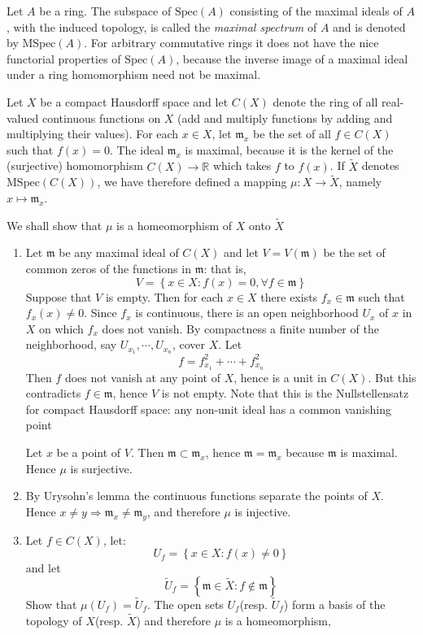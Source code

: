 \documentclass{solution}
\begin{document}
\begin{problem}
    Let $A$ be a ring. The subspace of $\mathrm{Spec}(A)$ consisting of the maximal ideals of $A$, with the induced topology, is called the \textit{maximal spectrum} of $A$ and is denoted by $\mathrm{MSpec}(A)$. For arbitrary commutative rings it does not have the nice functorial properties of $\mathrm{Spec}(A)$, because the inverse image of a maximal ideal under a ring homomorphism need not be maximal.

    Let $X$ be a compact Hausdorff space and let $C(X)$ denote the ring of all real-valued continuous functions on $X$ (add and multiply functions by adding and multiplying their values). For each $x \in X$, let $\mathfrak{m}_x$ be the set of all $f \in C(X)$ such that $f(x) = 0$. The ideal $\mathfrak{m}_x$ is maximal, because it is the kernel of the (surjective) homomorphism $C(X) \rightarrow \mathbb{R}$ which takes $f$ to $f(x)$. If $\tilde{X}$ denotes $\mathrm{MSpec}(C(X))$, we have therefore defined a mapping $\mu: X \rightarrow \tilde{X}$, namely $x \mapsto \mathfrak{m}_x$.

    We shall show that $\mu$ is a homeomorphism of $X$ onto $\tilde{X}$
    \begin{enumerate}
        \item Let $\mathfrak{m}$ be any maximal ideal of $C(X)$ and let $V = V(\mathfrak{m})$ be the set of common zeros of the functions in $\mathfrak{m}$: that is,
        $$V = \left\lbrace x \in X: f(x) = 0, \forall f \in \mathfrak{m} \right\rbrace$$
        Suppose that $V$ is empty. Then for each $x \in X$ there exists $f_x \in \mathfrak{m}$ such that $f_x(x) \ne 0$. Since $f_x$ is continuous, there is an open neighborhood $U_x$ of $x$ in $X$ on which $f_x$ does not vanish. By compactness a finite number of the neighborhood, say $U_{x_1}, \cdots, U_{x_n}$, cover $X$. Let
        $$f = f_{x_1}^2 + \cdots + f_{x_n}^2$$
        Then $f$ does not vanish at any point of $X$, hence is a unit in $C(X)$. But this contradicts $f \in \mathfrak{m}$, hence $V$ is not empty. {\color{red} Note that this is the Nullstellensatz for compact Hausdorff space: any non-unit ideal has a common vanishing point}
        
        Let $x$ be a point of $V$. Then $\mathfrak{m} \subset \mathfrak{m}_x$, hence $\mathfrak{m} = \mathfrak{m}_x$ because $\mathfrak{m}$ is maximal. Hence $\mu$ is surjective. 

        \item By Urysohn's lemma the continuous functions separate the points of $X$. Hence $x \ne y \Rightarrow \mathfrak{m}_x \ne \mathfrak{m}_y$, and therefore $\mu$ is injective.
        \item Let $f \in C(X)$, let:
        $$U_f = \left\lbrace x \in X: f(x) \ne 0 \right\rbrace$$
        and let
        $$\tilde{U}_f = \left\lbrace \mathfrak{m} \in \tilde{X}: f \notin \mathfrak{m} \right\rbrace$$
        Show that $\mu(U_f) = \tilde{U}_f$. The open sets $U_f$(resp. $\tilde{U}_f$) form a basis of the topology of $X$(resp. $\tilde{X}$) and therefore $\mu$ is a homeomorphism,
    \end{enumerate}


\end{problem}
\end{document}
